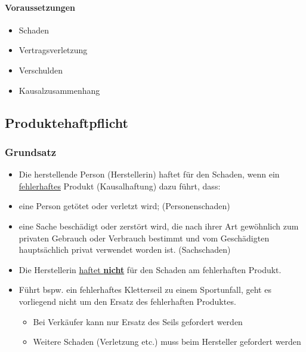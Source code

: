 \paragraph{Voraussetzungen}
\begin{minipage}{0.5\linewidth}
    \begin{itemize}
        \item Schaden
        \item Vertragsverletzung
    \end{itemize}
\end{minipage}
\begin{minipage}{0.5\linewidth}
    \begin{itemize}
        \item Verschulden
        \item Kausalzusammenhang
    \end{itemize}
\end{minipage}

\subsection{Produktehaftpflicht}

\subsubsection{Grundsatz}
\begin{itemize}
    \item Die herstellende Person (Herstellerin) haftet für den Schaden, wenn ein \underline{fehlerhaftes} Produkt (Kausalhaftung) dazu führt, dass:
    \item eine Person getötet oder verletzt wird; (Personenschaden)
    \item eine Sache beschädigt oder zerstört wird, die nach ihrer Art gewöhnlich zum privaten Gebrauch oder Verbrauch bestimmt und vom Geschädigten hauptsächlich privat verwendet worden ist. (Sachschaden)
    \item Die Herstellerin \underline{haftet \textbf{nicht}} für den Schaden am fehlerhaften Produkt.
    \item Führt bspw. ein fehlerhaftes Kletterseil zu einem Sportunfall, geht es vorliegend nicht um den Ersatz des fehlerhaften Produktes.
    \begin{itemize}
        \item Bei Verkäufer kann nur Ersatz des Seils gefordert werden
        \item Weitere Schaden (Verletzung etc.) muss beim Hersteller gefordert werden
    \end{itemize}
\end{itemize}

